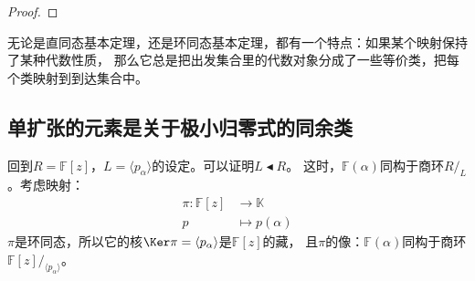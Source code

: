\documentclass[12pt,UTF8,fontset=none]{ctexbook}
\begin{document}
\begin{appendix}
\begin{proof}
\end{proof}


无论是直同态基本定理，还是环同态基本定理，都有一个特点：如果某个映射保持了某种代数性质，
那么它总是把出发集合里的代数对象分成了一些等价类，把每个类映射到到达集合中。

\subsection{单扩张的元素是关于极小归零式的同余类}
回到$R = \mathbb{F}[z]$，$L = \langle p_\alpha \rangle$的设定。可以证明$L \blacktriangleleft R$。
这时，$\mathbb{F}(\alpha)$同构于商环$R/_L$。考虑映射：
\begin{align*}
    \pi : \mathbb{F}[z] &\rightarrow \mathbb{K}  \\
    p &\mapsto p(\alpha)  
\end{align*}
$\pi$是环同态，所以它的核$\Ker\pi = \langle p_\alpha \rangle$是$\mathbb{F}[z]$的藏，
且$\pi$的像：$\mathbb{F}(\alpha)$同构于商环$\mathbb{F}[z] /_{\langle p_\alpha \rangle}$。


\end{appendix}
\end{document}
